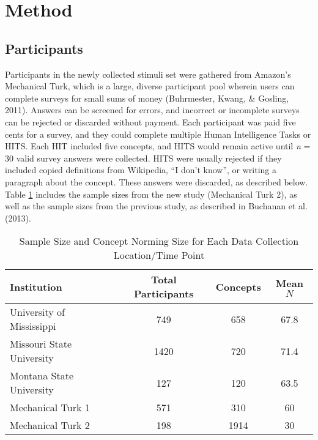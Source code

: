 \documentclass[english,man]{apa6}
\theoremstyle{definition}
\theoremstyle{definition}
\theoremstyle{definition}
\theoremstyle{remark}
\begin{document}
\section{Method}\label{method}

\subsection{Participants}\label{participants}

Participants in the newly collected stimuli set were gathered from
Amazon's Mechanical Turk, which is a large, diverse participant pool
wherein users can complete surveys for small sums of money (Buhrmester,
Kwang, \& Gosling, 2011). Answers can be screened for errors, and
incorrect or incomplete surveys can be rejected or discarded without
payment. Each participant was paid five cents for a survey, and they
could complete multiple Human Intelligence Tasks or HITS. Each HIT
included five concepts, and HITS would remain active until \emph{n} = 30
valid survey answers were collected. HITS were usually rejected if they
included copied definitions from Wikipedia, \enquote{I don't know}, or
writing a paragraph about the concept. These answers were discarded, as
described below. Table \ref{tab:part-table} includes the sample sizes
from the new study (Mechanical Turk 2), as well as the sample sizes from
the previous study, as described in Buchanan et al. (2013).

\begin{table}[tbp]
\begin{center}
\begin{threeparttable}
\caption{\label{tab:part-table}Sample Size and Concept Norming Size for Each Data Collection Location/Time Point}
\begin{tabular}{lccc}
\toprule
Institution & Total Participants & Concepts & Mean $N$\\
\midrule
University of Mississippi & 749 & 658 & 67.8\\
Missouri State University & 1420 & 720 & 71.4\\
Montana State University & 127 & 120 & 63.5\\
Mechanical Turk 1 & 571 & 310 & 60\\
Mechanical Turk 2 & 198 & 1914 & 30\\
\bottomrule
\end{tabular}
\end{threeparttable}
\end{center}
\end{table}
\end{document}
